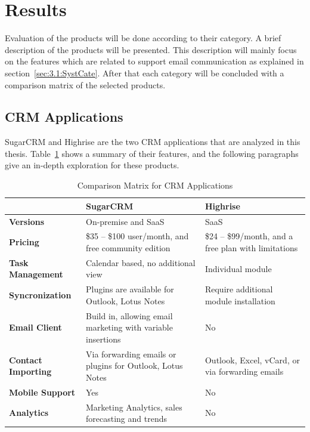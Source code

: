 \section{Results}
\label{sec:3.3:Resul}
Evaluation of the products will be done according to their category. A brief description of the products will be presented. This description will mainly focus on the features which are related to support email communication as explained in section~\ref{sec:3.1:SystCate}. After that each category will be concluded with a comparison matrix of the selected products.

\subsection{CRM Applications}
\label{subsec:3.3.1:CRMAppl}

SugarCRM and Highrise are the two \ac{CRM} applications that are analyzed in this thesis. Table~\ref{tab:comp_matr_crm} shows a summary of their features, and the following paragraphs give an in-depth exploration for these products.

\begin{table}[!ht]
\begin{center}
	\caption[Comparison Matrix for CRM Applications]{Comparison Matrix for CRM Applications} \label{tab:comp_matr_crm}
    \begin{tabular}{ | p{3cm} | p{5cm} | p{5cm} | }
	\hline
	& \textbf{SugarCRM} & \textbf{Highrise} \\ \hline
	\textbf{Versions} & On-premise and SaaS & SaaS \\ \hline
	\textbf{Pricing} & \$35 -- \$100 user/month, and free community edition & \$24 -- \$99/month, and a free plan with limitations \\ \hline
	\textbf{Task Management} & Calendar based, no additional view & Individual module \\ \hline
	\textbf{Syncronization} & Plugins are available for Outlook, Lotus Notes & Require additional module installation \\ \hline
	\textbf{Email Client} & Build in, allowing email marketing with variable insertions & No \\ \hline
	\textbf{Contact Importing} & Via forwarding emails or plugins for Outlook, Lotus Notes & Outlook, Excel, vCard, or via forwarding emails \\ \hline
	\textbf{Mobile Support} & Yes & No \\ \hline
	\textbf{Analytics} & Marketing Analytics, sales forecasting and trends & No \\ \hline
    \end{tabular}
\end{center}
\end{table}

